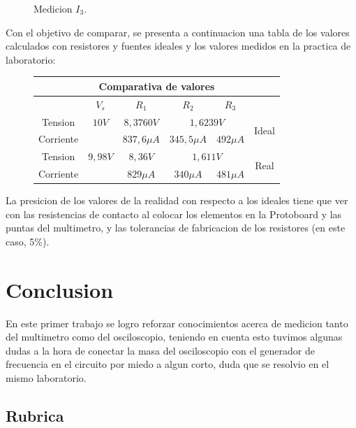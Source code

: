 \documentclass[a4paper,12pt, spanish]{report}
\begin{document}
\begin{figure}[H]
\begin{minipage}{0.3\textwidth}
            \caption{Medicion $I_3$.}
          \end{minipage}
      \end{figure}


      Con el objetivo de comparar, se presenta a continuacion una tabla de los valores calculados con resistores y
      fuentes ideales y los valores medidos en la practica de laboratorio:
      \begin{figure}[!h]
        \centering
        \begin{tabular}[c]{|c||c|c|c|c||c|}
          \hline
          \multicolumn{6}{|c|}{Comparativa de valores}\\
          \hline
                    & $V_s$         & $R_1$         & $R_2$         & $R_3$         & \\
          \hline
          Tension   & $10V$         & $8,3760V$     & \multicolumn{2}{|c||}{$1,6239V$} & \multirow{2}{*}{Ideal}\\
          \cline{1-5}
          Corriente &               & $837,6\mu A$  & $345,5\mu A$  & $492\mu A$    & \\
          \hline
          Tension   & $9,98V$       & $8,36V$       & \multicolumn{2}{|c||}{$1,611V$}  & \multirow{2}{*}{Real}\\
          \cline{1-5}
          Corriente &               & $829\mu A$    & $340\mu A$    & $481\mu A$    & \\
          \hline
        \end{tabular}
      \end{figure}
      
      La presicion de los valores de la realidad con respecto a los ideales tiene que ver con las resistencias de
      contacto al colocar los elementos en la Protoboard y las puntas del multimetro, y las tolerancias de fabricacion
      de los resistores (en este caso, 5\%).
      \newpage
      \chapter{Conclusion}
      En este primer trabajo se logro reforzar conocimientos acerca de medicion tanto del multimetro como del osciloscopio, teniendo en cuenta esto tuvimos algunas dudas a la hora de conectar la masa del osciloscopio con el generador de frecuencia en el circuito por miedo a algun corto, duda que se resolvio en el mismo laboratorio.

      \section{Rubrica}
      
\end{document}
